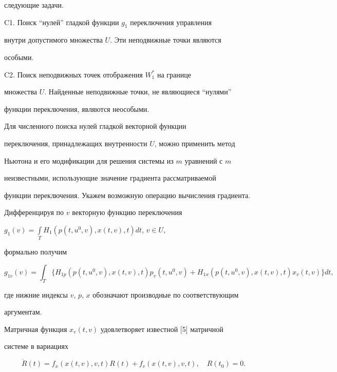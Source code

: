 следующие задачи. 


 


C1. Поиск ``нулей'' гладкой функции $g_1$ переключения управления 


внутри допустимого множества $U$. Эти неподвижные точки являются 


особыми. 


 


C2. Поиск неподвижных точек отображения $W^*_1$ на границе 


множества $U$. Найденные неподвижные точки, не являющиеся ``нулями'' 


функции переключения, являются неособыми. 


 


Для численного поиска нулей гладкой векторной функции 


переключения, принадлежащих внутренности $U$, можно применить метод 


Ньютона и его модификации для решения системы из $m$ уравнений с $m$ 


неизвестными, использующие значение градиента рассматриваемой 


функции переключения. Укажем возможную операцию вычисления градиента. 


 


Дифференцируя по $v$ векторную функцию переключения 


$g_1(v)=\int\limits_T H_1(p(t,u^0,v),x(t,v),t)d t$, $v\in U$, 


формально получим 


$$ 


g_{1v}(v)=\int_T\{H_{1p}(p(t,u^0,v),x(t,v),t) 


p_v(t,u^0,v)+H_{1x}(p(t,u^0,v),x(t,v),t) 


x_v(t,v)\}d t, 


$$ 


где нижние индексы $v$, $p$, $x$ обозначают производные по соответствующим 


аргументам. 


 


Матричная функция $x_v(t,v)$ удовлетворяет известной [5] матричной 


системе в вариациях 


\begin{equation} 


\Dot R(t)=f_x(x(t,v),v,t)R(t)+f_v(x(t,v),v,t),\quad R(t_0)=0. 


\end{equation} 


